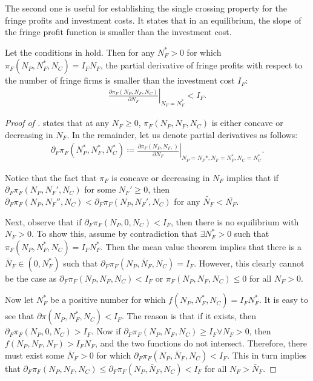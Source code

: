 The second one is useful for establishing the single crossing property for the fringe profits and investment costs.
It states that in an equilibrium, the slope of the fringe profit function is smaller than the investment cost.
\begin{lemma}
    \label{lem:slope_at_eq}
    Let the conditions in  hold. Then for any $N_F^* > 0$ for which $\pi_F(N_P, N_F^*, N_C) = I_F N_F$, the partial derivative of fringe profits with respect to the number of fringe firms is smaller than the investment cost $I_F$:
    \begin{align*}
        \left. \frac{\partial \pi_F(N_P, N_F, N_C)}{\partial N_F} \right|_{N_F = N_F^*} < I_F.
    \end{align*}
\end{lemma}
\begin{proof}[Proof of ]
     states that at any $N_F \geq 0$, $\pi_F(N_P, N_F, N_C)$ is either concave or decreasing in $N_F$.
    In the remainder, let us denote partial derivatives as follows:
    \begin{align*}
        \partial_F \pi_F(N_P^*, N_F^*, N_C^*) \coloneqq \left. \frac{\partial \pi_F(N_P, N_F,  )}{\partial N_F} \right|_{N_P = N_P*, N_F = N_F^*, N_C = N_C^*}.
    \end{align*}

    Notice that the fact that $\pi_F$ is concave or decreasing in $N_F$ implies that if $\partial_F \pi_F(N_P, N_F', N_C)$ for some $N_F' \geq 0$, then $\partial_F \pi_F(N_P, N_F'', N_C) < \partial_F \pi_F(N_P, N_F', N_C)$ for any $\tilde{N_F} < \bar{N_F}$.

    Next, observe that if $\partial_F \pi_F(N_P, 0, N_C) < I_F$, then there is no equilibrium with $N_F > 0$.
    To show this, assume by contradiction that $\exists N_F^* > 0$ such that $\pi_F(N_P, N_F^*, N_C) = I_F N_F^*$.
    Then the mean value theorem implies that there is a $\bar{N}_F \in (0, N_F^*)$ such that $\partial_F \pi_F(N_P, \bar{N}_F, N_C) = I_F$.
    However, this clearly cannot be the case as $\partial_F \pi_F(N_P, N_F, N_C) < I_F$ or $\pi_F(N_P, N_F, N_C) \leq 0$ for all $N_F > 0$.

    Now let $N_F^*$ be a positive number for which $f(N_P, N_F^*, N_C) = I_F N_F^*$.
    It is easy to see that $\partial \pi(N_P, N_F^*, N_C) < I_F$.
    The reason is that if it exists, then $\partial_F \pi_F(N_P, 0, N_C) > I_F$.
    Now if $\partial_F \pi_F(N_P, N_F, N_C) \geq I_F \forall N_F > 0$, then $f(N_P, N_F, N_F) > I_F N_F$, and the two functions do not intersect.
    Therefore, there must exist some $\bar{N}_F > 0$ for which $\partial_F \pi_F(N_P, \bar{N}_F, N_C) < I_F$.
    This in turn implies that $\partial_F \pi_F(N_P, N_F, N_C) \leq \partial_F \pi_F(N_P, \bar{N}_F, N_C) < I_F$ for all $N_F > \bar{N}_F$.
\end{proof}

